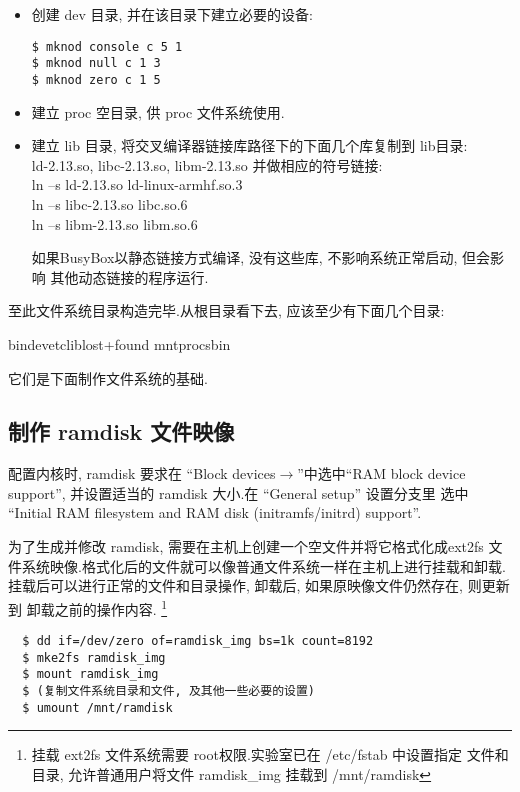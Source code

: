 \begin{itemize}
  \item 创建 dev 目录, 并在该目录下建立必要的设备:
\begin{verbatim}
$ mknod console c 5 1
$ mknod null c 1 3
$ mknod zero c 1 5
\end{verbatim}

  \item 建立 proc 空目录, 供 proc 文件系统使用.
  \item 建立 lib 目录, 将交叉编译器链接库路径下的下面几个库复制到 lib目录:\\
		ld-2.13.so, libc-2.13.so, libm-2.13.so 并做相应的符号链接:\\
		ln --s ld-2.13.so ld-linux-armhf.so.3\\
		ln --s libc-2.13.so libc.so.6\\
		ln --s libm-2.13.so libm.so.6

		如果BusyBox以静态链接方式编译, 没有这些库, 不影响系统正常启动, 但会影响
		其他动态链接的程序运行.
\end{itemize}

	至此文件系统目录构造完毕.从根目录看下去, 应该至少有下面几个目录:

	bin\qquad  dev\qquad  etc\qquad  lib\qquad lost+found\qquad
	mnt\qquad proc\qquad sbin

    它们是下面制作文件系统的基础.

\subsection{制作 ramdisk 文件映像}
	配置内核时, ramdisk 要求在 ``Block devices$\to$''中选中``RAM block
device support'', 并设置适当的 ramdisk 大小.在 ``General setup'' 设置分支里
选中 ``Initial RAM filesystem and RAM disk (initramfs/initrd) support''.

	为了生成并修改 ramdisk, 需要在主机上创建一个空文件并将它格式化成ext2fs
文件系统映像.格式化后的文件就可以像普通文件系统一样在主机上进行挂载和卸载.
挂载后可以进行正常的文件和目录操作, 卸载后, 如果原映像文件仍然存在, 则更新到
卸载之前的操作内容.
\footnote{ 挂载 ext2fs 文件系统需要 root权限.实验室已在 /etc/fstab 中设置指定
文件和目录, 允许普通用户将文件 ramdisk\_img 挂载到 /mnt/ramdisk}

\begin{boxedminipage}{.9\textwidth}
\begin{verbatim}
  $ dd if=/dev/zero of=ramdisk_img bs=1k count=8192
  $ mke2fs ramdisk_img
  $ mount ramdisk_img
  $ (复制文件系统目录和文件, 及其他一些必要的设置)
  $ umount /mnt/ramdisk
\end{verbatim}
\end{boxedminipage}

